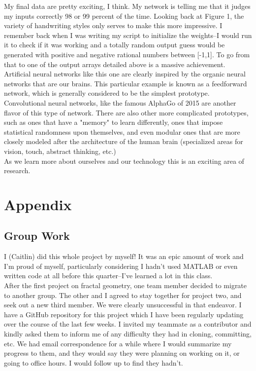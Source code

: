 \documentclass[letterpaper,11pt]{article}
\begin{document}
My final data are pretty exciting, I think. My network is telling me that it judges my inputs correctly 98 or 99 percent of the time. Looking back at Figure 1, the variety of handwriting styles only serves to make this more impressive. I remember back when I was writing my script to initialize the weights--I would run it to check if it was working and a totally random output guess would be generated with positive and negative rational numbers between [-1,1]. To go from that to one of the output arrays detailed above is a massive achievement.\\

Artificial neural networks like this one are clearly inspired by the organic neural networks that are our brains. This particular example is known as a feedforward network, which is generally considered to be the simplest prototype. Convolutional neural networks, like the famous AlphaGo of 2015 are another flavor of this type of network. There are also other more complicated prototypes, such as ones that have a "memory" to learn differently, ones that impose statistical randomness upon themselves, and even modular ones that are more closely modeled after the architecture of the human brain (specialized areas for vision, touch, abstract thinking, etc.)\\

As we learn more about ourselves and our technology this is an exciting area of research.

\section{Appendix}
\subsection{Group Work}

I (Caitlin) did this whole project by myself! It was an epic amount of work and I'm proud of myself, particularly considering I hadn't used MATLAB or even written code at all before this quarter--I've learned a lot in this class.\\

After the first project on fractal geometry, one team member decided to migrate to another group. The other and I agreed to stay together for project two, and seek out a new third member. We were clearly unsuccessful in that endeavor. I have a GitHub repository for this project which I have been regularly updating over the course of the last few weeks. I invited my teammate as a contributor and kindly asked them to inform me of any difficulty they had in cloning, committing, etc. We had email correspondence for a while where I would summarize my progress to them, and they would say they were planning on working on it, or going to office hours. I would follow up to find they hadn't.\\
\end{document}
